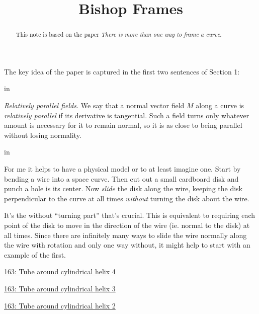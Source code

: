 \documentclass{ximera}
\title{Bishop Frames}
\newcommand{\pskip}{\vskip 0.1 in}
\begin{document}
\begin{abstract}
This note is based on the paper \emph{There is more than one way to frame a curve}.
\end{abstract}
\maketitle

The key idea of the paper is captured in the first two sentences of Section 1:

\pskip

\emph{Relatively parallel fields.} We say that a normal vector field $M$ along a curve is \emph{relatively parallel} if its derivative is tangential. Such a field turns only whatever amount is necessary for it to remain normal, so it is as close to being parallel without losing normality.

\pskip

For me it helps to have a physical model or to at least imagine one. Start by bending a wire into a space curve. Then cut out a small cardboard disk and punch a hole is its center. Now \emph{slide} the disk along the wire, keeping the disk perpendicular to the curve at all times \emph{without} turning the disk about the wire.

It's the without ``turning part'' that's crucial. This is equivalent to requiring each point of the disk to move in the direction of the wire (ie. normal to the disk) at all times. Since there are infinitely many ways to slide the wire normally along the wire with rotation and only one way without, it might help to start with an example of the first.


\begin{exploration}
\href{https://www.desmos.com/3d/o8a89toejw}{163: Tube around cylindrical helix 4}
\end{exploration}


\begin{exploration}
\href{https://www.desmos.com/3d/fg6l58x6tl}{163: Tube around cylindrical helix 3}
\end{exploration}

\begin{exploration}
\href{https://www.desmos.com/3d/agzievbron}{163: Tube around cylindrical helix 2}
\end{exploration}
\end{document}
